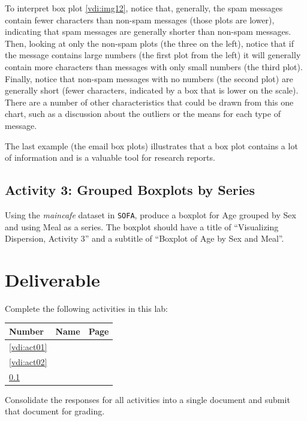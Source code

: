 To interpret box plot \ref{vdi:img12}, notice that, generally, the spam messages contain fewer characters than non-spam messages (those plots are lower), indicating that spam messages are generally shorter than non-spam messages. Then, looking at only the non-spam plots (the three on the left), notice that if the message contains large numbers (the first plot from the left) it will generally contain more characters than messages with only small numbers (the third plot). Finally, notice that non-spam messages with no numbers (the second plot) are generally short (fewer characters, indicated by a box that is lower on the scale). There are a number of other characteristics that could be drawn from this one chart, such as a discussion about the outliers or the means for each type of message.

The last example (the email box plots) illustrates that a box plot contains a lot of information and is a valuable tool for research reports. 

\subsection{Activity 3: Grouped Boxplots by Series} \label{vdi:act03}

Using the \textit{maincafe} dataset in \texttt{SOFA}, produce a boxplot for Age grouped by Sex and using Meal as a series. The boxplot should have a title of ``Visualizing Dispersion, Activity 3'' and a subtitle of ``Boxplot of Age by Sex and Meal''.

\section{Deliverable}

Complete the following activities in this lab:

\begin{center}
  \begin{tabular}{lll}
    \hline 
    \textbf{Number} & \textbf{Name} & \textbf{Page} \\ 
    \hline 
    \ref{vdi:act01} & \nameref{vdi:act01} & \pageref{vdi:act01} \\ 
    \ref{vdi:act02} & \nameref{vdi:act02} & \pageref{vdi:act02} \\ 
    \ref{vdi:act03} & \nameref{vdi:act03} & \pageref{vdi:act03} \\ 
    \hline 
  \end{tabular} 
\end{center}

Consolidate the responses for all activities into a single document and submit that document for grading.
